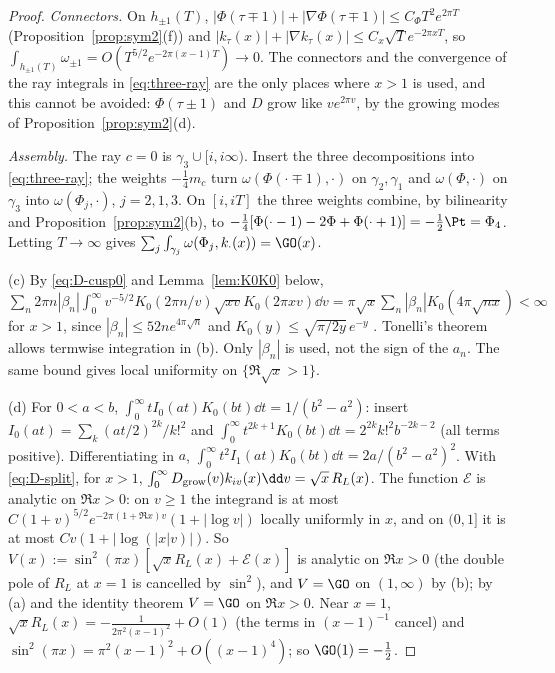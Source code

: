 \begin{proof}
\emph{Connectors.} On $h_{\pm1}(T)$, $|\Phi(\tau\mp1)|+|\nabla\Phi(\tau\mp1)|\le C_\Phi T^2e^{2\pi T}$ (Proposition~\ref{prop:sym2}(f)) and
$|k_\tau(x)|+|\nabla k_\tau(x)|\le C_x\sqrt Te^{-2\pi xT}$, so $\int_{h_{\pm1}(T)}\omega_{\pm1}=O(T^{5/2}e^{-2\pi(x-1)T})\to0$. The connectors and the
convergence of the ray integrals in \eqref{eq:three-ray} are the only places where $x>1$ is used, and this cannot be avoided: $\Phi(\tau\pm1)$
and $D$ grow like $ve^{2\pi v}$, by the growing modes of Proposition~\ref{prop:sym2}(d).

\emph{Assembly.} The ray $c=0$ is $\gamma_3\cup[i,i\infty)$. Insert the three decompositions into \eqref{eq:three-ray}; the weights $-\frac14m_c$ turn
$\omega(\Phi(\cdot\mp1),\cdot)$ on $\gamma_2,\gamma_1$ and $\omega(\Phi,\cdot)$ on $\gamma_3$ into $\omega(\Phi_j,\cdot)$, $j=2,1,3$. On $[i,iT]$ the three
weights combine, by bilinearity and Proposition~\ref{prop:sym2}(b), to $-\frac14[\Phi(\cdot-1)-2\Phi+\Phi(\cdot+1)]=-\frac12\Pt=\Phi_4$. Letting
$T\to\infty$ gives $\sum_j\int_{\gamma_j}\omega(\Phi_j,k_\cdot(x))=\GO(x)$.

(c) By \eqref{eq:D-cusp0} and Lemma~\ref{lem:K0K0} below,
$\sum_n2\pi n|\beta_n|\int_0^\infty v^{-5/2}K_0(2\pi n/v)\sqrt{xv}K_0(2\pi xv)\dd v=\pi\sqrt x\sum_n|\beta_n|K_0(4\pi\sqrt{nx})<\infty$ for $x>1$, since
$|\beta_n|\le52ne^{4\pi\sqrt n}$ and $K_0(y)\le\sqrt{\pi/2y}\,e^{-y}$ \cite[\S10.40(ii)]{DLMF}. Tonelli's theorem allows termwise integration in (b). Only $|\beta_n|$ is used,
not the sign of the $a_n$. The same bound gives local uniformity on $\{\Re\sqrt x>1\}$.

(d) For $0<a<b$, $\int_0^\infty tI_0(at)K_0(bt)\dd t=1/(b^2-a^2)$: insert $I_0(at)=\sum_k(at/2)^{2k}/k!^2$ and
$\int_0^\infty t^{2k+1}K_0(bt)\dd t=2^{2k}k!^2b^{-2k-2}$ \cite[10.43.19]{DLMF} (all terms positive). Differentiating in $a$,
$\int_0^\infty t^2I_1(at)K_0(bt)\dd t=2a/(b^2-a^2)^2$. With \eqref{eq:D-split}, for $x>1$,
$\int_0^\infty D_{\rm grow}(v)k_{iv}(x)\dd v=\sqrt x\,R_L(x)$. The function $\mathcal E$ is analytic on $\Re x>0$: on $v\ge1$ the integrand is at
most $C(1+v)^{5/2}e^{-2\pi(1+\Re x)v}(1+|\log v|)$ locally uniformly in $x$, and on $(0,1]$ it is at most $Cv(1+|\log(|x|v)|)$. So
$V(x):=\sin^2(\pi x)[\sqrt xR_L(x)+\mathcal E(x)]$ is analytic on $\Re x>0$ (the double pole of $R_L$ at $x=1$ is cancelled by $\sin^2$), and
$V=\GO$ on $(1,\infty)$ by (b); by (a) and the identity theorem $V=\GO$ on $\Re x>0$. Near $x=1$, $\sqrt xR_L(x)=-\frac1{2\pi^2(x-1)^2}+O(1)$
(the terms in $(x-1)^{-1}$ cancel) and $\sin^2(\pi x)=\pi^2(x-1)^2+O((x-1)^4)$; so $\GO(1)=-\frac12$.


\end{proof}
